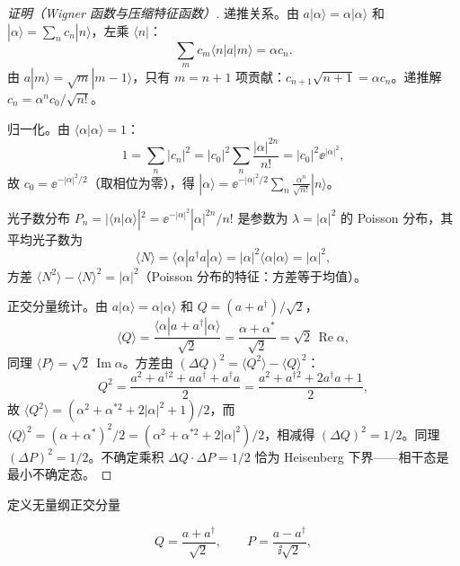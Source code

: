 \begin{proof}[证明（Wigner 函数与压缩特征函数）]
递推关系。由 $a|\alpha\rangle=\alpha|\alpha\rangle$ 和 $|\alpha\rangle=\sum_n c_n|n\rangle$，左乘 $\langle n|$：
\begin{equation*}
\sum_m c_m\langle n|a|m\rangle=\alpha c_n.
\end{equation*}
由 $a|m\rangle=\sqrt{m}|m-1\rangle$，只有 $m=n+1$ 项贡献：$c_{n+1}\sqrt{n+1}=\alpha c_n$。递推解 $c_n=\alpha^n c_0/\sqrt{n!}$。

归一化。由 $\langle\alpha|\alpha\rangle=1$：
\begin{equation*}
1=\sum_n|c_n|^2=|c_0|^2\sum_n\frac{|\alpha|^{2n}}{n!}=|c_0|^2\ee^{|\alpha|^2},
\end{equation*}
故 $c_0=\ee^{-|\alpha|^2/2}$（取相位为零），得 $|\alpha\rangle=\ee^{-|\alpha|^2/2}\sum_n\frac{\alpha^n}{\sqrt{n!}}|n\rangle$。

光子数分布 $P_n=|\langle n|\alpha\rangle|^2=\ee^{-|\alpha|^2}|\alpha|^{2n}/n!$ 是参数为 $\lambda=|\alpha|^2$ 的 Poisson 分布，其平均光子数为
\begin{equation*}
\langle N\rangle=\langle\alpha|a^\dagger a|\alpha\rangle=|\alpha|^2\langle\alpha|\alpha\rangle=|\alpha|^2,
\end{equation*}
方差 $\langle N^2\rangle-\langle N\rangle^2=|\alpha|^2$（Poisson 分布的特征：方差等于均值）。

正交分量统计。由 $a|\alpha\rangle=\alpha|\alpha\rangle$ 和 $Q=(a+a^\dagger)/\sqrt{2}$，
\begin{equation*}
\langle Q\rangle=\frac{\langle\alpha|a+a^\dagger|\alpha\rangle}{\sqrt2}
=\frac{\alpha+\alpha^*}{\sqrt2}
=\sqrt2\,\operatorname{Re}\alpha,
\end{equation*}
同理 $\langle P\rangle=\sqrt2\,\operatorname{Im}\alpha$。方差由 $(\Delta Q)^2=\langle Q^2\rangle-\langle Q\rangle^2$：
\begin{equation*}
Q^2=\frac{a^2+a^{\dagger2}+aa^\dagger+a^\dagger a}{2}
=\frac{a^2+a^{\dagger2}+2a^\dagger a+1}{2},
\end{equation*}
故 $\langle Q^2\rangle=(\alpha^2+\alpha^{*2}+2|\alpha|^2+1)/2$，而 $\langle Q\rangle^2=(\alpha+\alpha^*)^2/2=(\alpha^2+\alpha^{*2}+2|\alpha|^2)/2$，相减得 $(\Delta Q)^2=1/2$。同理 $(\Delta P)^2=1/2$。不确定乘积 $\Delta Q\cdot\Delta P=1/2$ 恰为 Heisenberg 下界——相干态是最小不确定态。
\end{proof}

定义无量纲正交分量

\[
Q=\frac{a+a^\dagger}{\sqrt2},
\qquad
P=\frac{a-a^\dagger}{\ii\sqrt2},
\]

